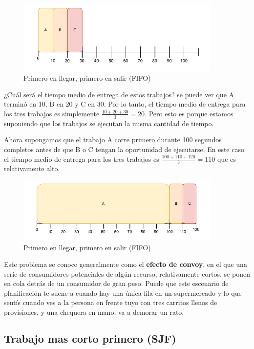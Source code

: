 \documentclass{article}
\begin{document}
\begin{figure}[h]
    \centering
    \includegraphics[width=0.9\textwidth]{src/fifo.pdf}
    \caption{Primero en llegar, primero en salir (FIFO)}
\end{figure}

¿Cuál será el tiempo medio de entrega de estos trabajos? se puede ver que A terminó en 10, B en 20 y C en 30. Por lo tanto, el tiempo medio de entrega para los tres trabajos es simplemente $\frac{10+20+30}{3}=20$. Pero esto es porque estamos suponiendo que los trabajos se ejecutan la misma cantidad de tiempo.

Ahora supongamos que el trabajo A corre primero durante 100 segundos completos antes de que B o C tengan la oportunidad de ejecutarse. En este caso el tiempo medio de entrega para los tres trabajos es $\frac{100+110+120}{3}=110$ que es relativamente alto.

\begin{figure}[h]
    \centering
    \includegraphics[width=0.9\textwidth]{src/fifo1.pdf}
    \caption{Primero en llegar, primero en salir (FIFO)}
\end{figure}

Este problema se conoce generalmente como el \textbf{efecto de convoy}, en el que una serie de consumidores potenciales de algún recurso, relativamente cortos, se ponen en cola detrás de un consumidor de gran peso. Puede que este escenario de planificación te suene a cuando hay una única fila en un supermercado y lo que sentís cuando ves a la persona en frente tuyo con tres carritos llenos de provisiones, y una chequera en mano; va a demorar un rato.

\subsection{Trabajo mas corto primero (SJF)}
\end{document}
